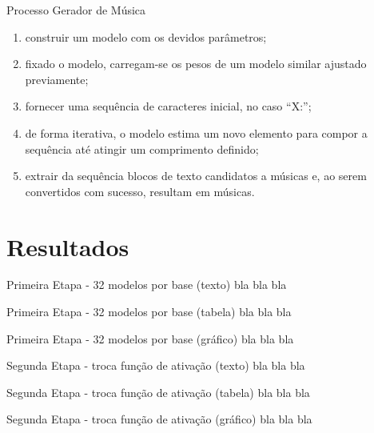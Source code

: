 \documentclass{beamer}
\begin{document}
    \begin{frame}{Processo Gerador de Música}
        \begin{enumerate}
            \justifying
            \item construir um modelo com os devidos parâmetros; 
            \item fixado o modelo, carregam-se os pesos de um modelo similar ajustado previamente;
            \item fornecer uma sequência de caracteres inicial, no caso ``X:'';
            \item de forma iterativa, o modelo estima um novo elemento para compor a sequência até atingir um comprimento definido;
            \item extrair da sequência blocos de texto candidatos a músicas e, ao serem convertidos com sucesso, resultam em músicas.
        \end{enumerate}
    \end{frame}



\section{Resultados}
    \begin{frame}{Primeira Etapa - 32 modelos por base (texto)}
        bla bla bla
    \end{frame}
    
    \begin{frame}{Primeira Etapa - 32 modelos por base (tabela)}
        bla bla bla
    \end{frame}

    \begin{frame}{Primeira Etapa - 32 modelos por base (gráfico)}
        bla bla bla
    \end{frame}

    \begin{frame}{Segunda Etapa - troca função de ativação (texto)}
        bla bla bla
    \end{frame}
    
    \begin{frame}{Segunda Etapa - troca função de ativação (tabela)}
        bla bla bla
    \end{frame}
    
    \begin{frame}{Segunda Etapa - troca função de ativação (gráfico)}
        bla bla bla
    \end{frame}
    
\end{document}
